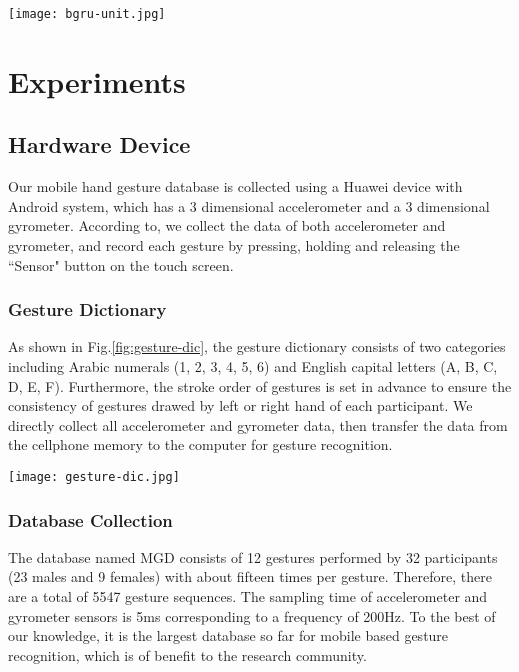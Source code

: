 \documentclass[review]{elsarticle}
\begin{document}
\begin{figure*}[h]
	\centering
	\texttt{[image: bgru-unit.jpg]}
	\caption{BGRU unit.}
	\label{fig:bgru-unit}
\end{figure*}

\section{Experiments}\label{sec:experiments}
\subsection{Hardware Device}\label{sec:database}
Our mobile hand gesture database is collected using a Huawei device with Android system, which has a 3 dimensional accelerometer and a 3 dimensional gyrometer. According to\;\cite{lefebvre2013ANN}, we collect the data of both accelerometer and gyrometer, {and record each gesture by pressing, holding and releasing the ``Sensor" button on the touch screen.}

\subsubsection{Gesture Dictionary}
As shown in Fig.\;\ref{fig:gesture-dic}, the gesture dictionary consists of two categories including Arabic numerals (1, 2, 3, 4, 5, 6) and English capital letters (A, B, C, D, E, F). Furthermore, the stroke order of gestures is set in advance to ensure the consistency of gestures drawed by left or right hand of each participant.
We directly collect all accelerometer and gyrometer data, then transfer the data from the cellphone memory to the computer for gesture recognition.

\begin{figure*}[htbp]
	\normalsize
	\centering
	\texttt{[image: gesture-dic.jpg]}
	\caption{Examples of hand gestures in \textbf{{MGD} database}.}
	\label{fig:gesture-dic}%
	\vspace*{4pt}
\end{figure*}

\subsubsection{Database Collection} The database named MGD consists of 12 gestures performed by 32 participants (23 males and 9 females) with about fifteen times per gesture. Therefore, there are a total of 5547 gesture sequences. The sampling time of accelerometer and gyrometer sensors is 5ms corresponding to a frequency of 200Hz. To the best of our knowledge, it is the largest database so far for mobile based gesture recognition, {which is of benefit to the research community}.
\end{document}
